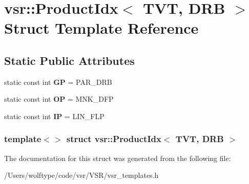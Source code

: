 \hypertarget{structvsr_1_1_product_idx_3_01_t_v_t_00_01_d_r_b_01_4}{\section{vsr\-:\-:Product\-Idx$<$ T\-V\-T, D\-R\-B $>$ Struct Template Reference}
\label{structvsr_1_1_product_idx_3_01_t_v_t_00_01_d_r_b_01_4}
}
\subsection*{Static Public Attributes}
\begin{DoxyCompactItemize}
\item 
\hypertarget{structvsr_1_1_product_idx_3_01_t_v_t_00_01_d_r_b_01_4_aadc4f9d8f56dab89872876c013a1ba6b}{static const int {\bfseries G\-P} = P\-A\-R\-\_\-\-D\-R\-B}\label{structvsr_1_1_product_idx_3_01_t_v_t_00_01_d_r_b_01_4_aadc4f9d8f56dab89872876c013a1ba6b}

\item 
\hypertarget{structvsr_1_1_product_idx_3_01_t_v_t_00_01_d_r_b_01_4_a160d215f4d7cf78131cbb8a548828394}{static const int {\bfseries O\-P} = M\-N\-K\-\_\-\-D\-F\-P}\label{structvsr_1_1_product_idx_3_01_t_v_t_00_01_d_r_b_01_4_a160d215f4d7cf78131cbb8a548828394}

\item 
\hypertarget{structvsr_1_1_product_idx_3_01_t_v_t_00_01_d_r_b_01_4_ac9d68217ae73f2b7d8a21148f066584e}{static const int {\bfseries I\-P} = L\-I\-N\-\_\-\-F\-L\-P}\label{structvsr_1_1_product_idx_3_01_t_v_t_00_01_d_r_b_01_4_ac9d68217ae73f2b7d8a21148f066584e}

\end{DoxyCompactItemize}
\subsubsection*{template$<$$>$ struct vsr\-::\-Product\-Idx$<$ T\-V\-T, D\-R\-B $>$}



The documentation for this struct was generated from the following file\-:\begin{DoxyCompactItemize}
\item 
/\-Users/wolftype/code/vsr/\-V\-S\-R/vsr\-\_\-templates.\-h\end{DoxyCompactItemize}
